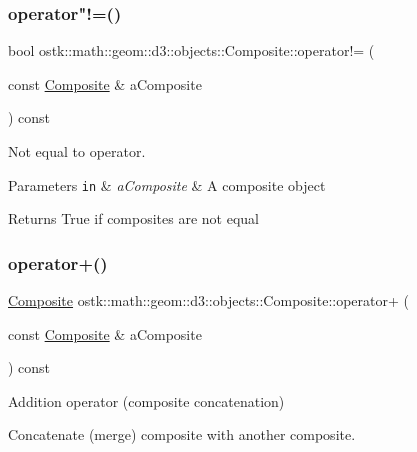 \subsubsection{\texorpdfstring{operator"!=()}{operator!=()}}
{\footnotesize\ttfamily bool ostk\+::math\+::geom\+::d3\+::objects\+::\+Composite\+::operator!= (\begin{DoxyParamCaption}\item[{const \hyperlink{classostk_1_1math_1_1geom_1_1d3_1_1objects_1_1_composite}{Composite} \&}]{a\+Composite }\end{DoxyParamCaption}) const}



Not equal to operator. 


\begin{DoxyParams}[1]{Parameters}
\mbox{\tt in}  & {\em a\+Composite} & A composite object \\
\hline
\end{DoxyParams}
\begin{DoxyReturn}{Returns}
True if composites are not equal 
\end{DoxyReturn}
\mbox{\label{classostk_1_1math_1_1geom_1_1d3_1_1objects_1_1_composite_a15a01835377b51a08b748762bc29411b}} 
\subsubsection{\texorpdfstring{operator+()}{operator+()}}
{\footnotesize\ttfamily \hyperlink{classostk_1_1math_1_1geom_1_1d3_1_1objects_1_1_composite}{Composite} ostk\+::math\+::geom\+::d3\+::objects\+::\+Composite\+::operator+ (\begin{DoxyParamCaption}\item[{const \hyperlink{classostk_1_1math_1_1geom_1_1d3_1_1objects_1_1_composite}{Composite} \&}]{a\+Composite }\end{DoxyParamCaption}) const}



Addition operator (composite concatenation) 

Concatenate (merge) composite with another composite.


